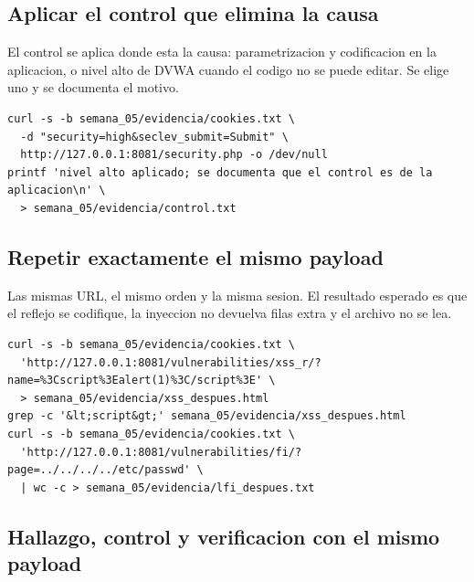 \documentclass[11pt,a4paper]{article}
\begin{document}
\subsection{Aplicar el control que elimina la causa}

El control se aplica donde esta la causa: parametrizacion y codificacion en la aplicacion, o nivel alto de DVWA cuando el codigo no se puede editar. Se elige uno y se documenta el motivo.

\begin{lstlisting}[style=estiloCodigo]
curl -s -b semana_05/evidencia/cookies.txt \
  -d "security=high&seclev_submit=Submit" \
  http://127.0.0.1:8081/security.php -o /dev/null
printf 'nivel alto aplicado; se documenta que el control es de la aplicacion\n' \
  > semana_05/evidencia/control.txt
\end{lstlisting}

\subsection{Repetir exactamente el mismo payload}

Las mismas URL, el mismo orden y la misma sesion. El resultado esperado es que el reflejo se codifique, la inyeccion no devuelva filas extra y el archivo no se lea.

\begin{lstlisting}[style=estiloCodigo]
curl -s -b semana_05/evidencia/cookies.txt \
  'http://127.0.0.1:8081/vulnerabilities/xss_r/?name=%3Cscript%3Ealert(1)%3C/script%3E' \
  > semana_05/evidencia/xss_despues.html
grep -c '&lt;script&gt;' semana_05/evidencia/xss_despues.html
curl -s -b semana_05/evidencia/cookies.txt \
  'http://127.0.0.1:8081/vulnerabilities/fi/?page=../../../../etc/passwd' \
  | wc -c > semana_05/evidencia/lfi_despues.txt
\end{lstlisting}

\needspace{8\baselineskip}\subsection{Hallazgo, control y verificacion con el mismo payload}
\end{document}
